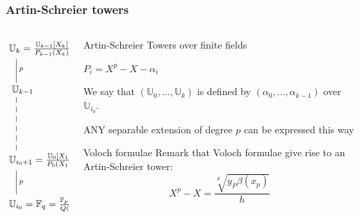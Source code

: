 \documentclass[10pt]{beamer}
\newcommand{\U}{\mathbb{U}}  %
\newcommand{\F}{\mathbb{F}}  %
\newcommand{\0}{\mathcal{O}}  %
\begin{document}

\begin{frame}
  \frametitle{Artin-Schreier towers}

  \begin{columns}
    \begin{column}{0.3\textwidth}
      \Large\[\xymatrix{
        *+[r]{\U_k = \frac{\U_{k-1}[X_k]}{P_{k-1}(X_k)}}\ar@{-}[d]^p\\
        *+[r]{\U_{k-1}} \ar@{--}[dd]\\
        \\
        *+[r]{\U_{i_0+1} = \frac{\U_0[X_1]}{P_0(X_1)}} \ar@{-}[d]^p\\
        *+[r]{\U_{i_0} = \F_q = \frac{\F_p[X_0]}{Q(X_0)}}
      }\]
    \end{column}
    \begin{column}{0.65\textwidth}
      \begin{block}{Artin-Schreier Towers over finite fields}
        \smallskip
        \begin{center}
          \Large$P_i = X^p - X - \alpha_i$
        \end{center}

        \begin{center}
          We say that $(\U_0,\ldots,\U_k)$ is defined by
          $(\alpha_0,\ldots,\alpha_{k-1})$ over $\U_{i_0}$.
        \end{center}
        \begin{center}
          \alert{ANY} separable extension of degree $p$ can be
          expressed this way
        \end{center}
      \end{block}

      \begin{block}{Voloch formulae}
        Remark that Voloch formulae give rise to an Artin-Schreier
        tower:
        \[X^p - X = \frac{\sqrt[p]{y_P\beta(x_p)}}{h}\]
      \end{block}
    \end{column}
  \end{columns}
\end{frame}

\end{document}

